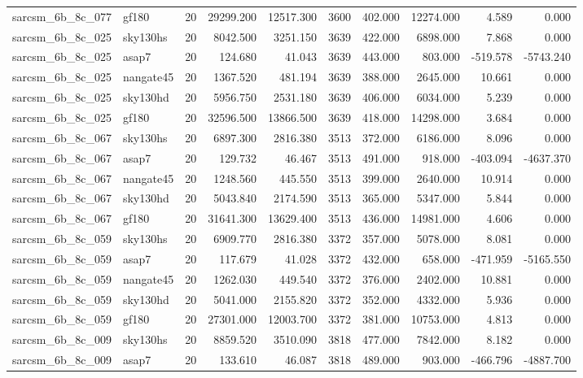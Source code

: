 \begin{longtable}{llrrrrrrrr}
sarcsm\_6b\_8c\_077 & gf180 & 20 & 29299.200 & 12517.300 & 3600 & 402.000 & 12274.000 & 4.589 & 0.000 \\
sarcsm\_6b\_8c\_025 & sky130hs & 20 & 8042.500 & 3251.150 & 3639 & 422.000 & 6898.000 & 7.868 & 0.000 \\
sarcsm\_6b\_8c\_025 & asap7 & 20 & 124.680 & 41.043 & 3639 & 443.000 & 803.000 & -519.578 & -5743.240 \\
sarcsm\_6b\_8c\_025 & nangate45 & 20 & 1367.520 & 481.194 & 3639 & 388.000 & 2645.000 & 10.661 & 0.000 \\
sarcsm\_6b\_8c\_025 & sky130hd & 20 & 5956.750 & 2531.180 & 3639 & 406.000 & 6034.000 & 5.239 & 0.000 \\
sarcsm\_6b\_8c\_025 & gf180 & 20 & 32596.500 & 13866.500 & 3639 & 418.000 & 14298.000 & 3.684 & 0.000 \\
sarcsm\_6b\_8c\_067 & sky130hs & 20 & 6897.300 & 2816.380 & 3513 & 372.000 & 6186.000 & 8.096 & 0.000 \\
sarcsm\_6b\_8c\_067 & asap7 & 20 & 129.732 & 46.467 & 3513 & 491.000 & 918.000 & -403.094 & -4637.370 \\
sarcsm\_6b\_8c\_067 & nangate45 & 20 & 1248.560 & 445.550 & 3513 & 399.000 & 2640.000 & 10.914 & 0.000 \\
sarcsm\_6b\_8c\_067 & sky130hd & 20 & 5043.840 & 2174.590 & 3513 & 365.000 & 5347.000 & 5.844 & 0.000 \\
sarcsm\_6b\_8c\_067 & gf180 & 20 & 31641.300 & 13629.400 & 3513 & 436.000 & 14981.000 & 4.606 & 0.000 \\
sarcsm\_6b\_8c\_059 & sky130hs & 20 & 6909.770 & 2816.380 & 3372 & 357.000 & 5078.000 & 8.081 & 0.000 \\
sarcsm\_6b\_8c\_059 & asap7 & 20 & 117.679 & 41.028 & 3372 & 432.000 & 658.000 & -471.959 & -5165.550 \\
sarcsm\_6b\_8c\_059 & nangate45 & 20 & 1262.030 & 449.540 & 3372 & 376.000 & 2402.000 & 10.881 & 0.000 \\
sarcsm\_6b\_8c\_059 & sky130hd & 20 & 5041.000 & 2155.820 & 3372 & 352.000 & 4332.000 & 5.936 & 0.000 \\
sarcsm\_6b\_8c\_059 & gf180 & 20 & 27301.000 & 12003.700 & 3372 & 381.000 & 10753.000 & 4.813 & 0.000 \\
sarcsm\_6b\_8c\_009 & sky130hs & 20 & 8859.520 & 3510.090 & 3818 & 477.000 & 7842.000 & 8.182 & 0.000 \\
sarcsm\_6b\_8c\_009 & asap7 & 20 & 133.610 & 46.087 & 3818 & 489.000 & 903.000 & -466.796 & -4887.700 \\

\end{longtable}

